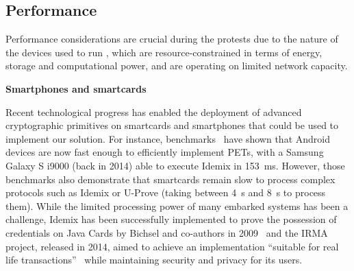 \subsection{Performance}%
\label{PerformanceAnalysis}


Performance considerations are crucial during the protests due to the nature of 
the devices used to run \CROCUS, which are resource-constrained in terms of 
energy, storage and computational power, and are operating on limited network 
capacity. 


\textbf{Smartphones and smartcards}

Recent technological progress has enabled the deployment of advanced 
cryptographic primitives on smartcards and smartphones that could be used to 
implement our solution.
For instance, benchmarks~\cite{Benchmarking} have shown that Android devices 
are now fast enough to efficiently implement \acp{PET}, with a Samsung Galaxy S 
i9000 (back in 2014) able to execute Idemix in \SI{153}{\milli\second}. 
However, those benchmarks also demonstrate that smartcards remain slow to 
process complex protocols such as Idemix or U-Prove (taking between 
\SI{4}{\second} and \SI{8}{\second} to process them). While the limited 
processing power of many embarked systems has been a challenge, Idemix has been 
successfully implemented to prove the possession of credentials on Java Cards 
by Bichsel and co-authors in 2009~\cite{Bichsel} and the IRMA project, released 
in 2014, aimed to achieve an implementation ``suitable for real life 
transactions''~\cite{IRMA} while maintaining security and privacy for its 
users. 

